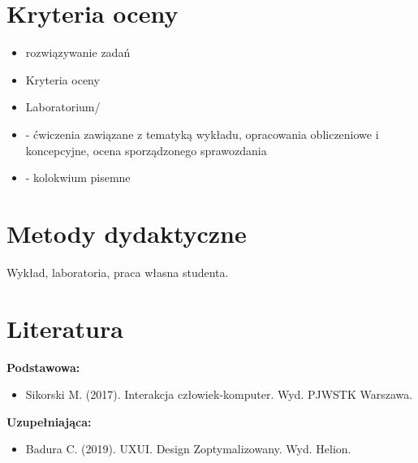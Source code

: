 \documentclass[12pt, a4paper]{article}
\begin{document}
\section{Kryteria oceny}

\begin{itemize}
  \item rozwiązywanie zadań
  \item Kryteria oceny
  \item Laboratorium/
  \item - ćwiczenia zawiązane z tematyką wykładu, opracowania obliczeniowe i koncepcyjne, ocena sporządzonego sprawozdania
  \item -  kolokwium pisemne
\end{itemize}

\section{Metody dydaktyczne}

Wykład, laboratoria, praca własna studenta.

\section{Literatura}

\textbf{Podstawowa:}
\begin{itemize}
  \item Sikorski M. (2017). Interakcja człowiek-komputer. Wyd. PJWSTK Warszawa.
\end{itemize}

\textbf{Uzupełniająca:}
\begin{itemize}
  \item Badura C. (2019). UXUI. Design Zoptymalizowany. Wyd. Helion.
\end{itemize}
\end{document}
